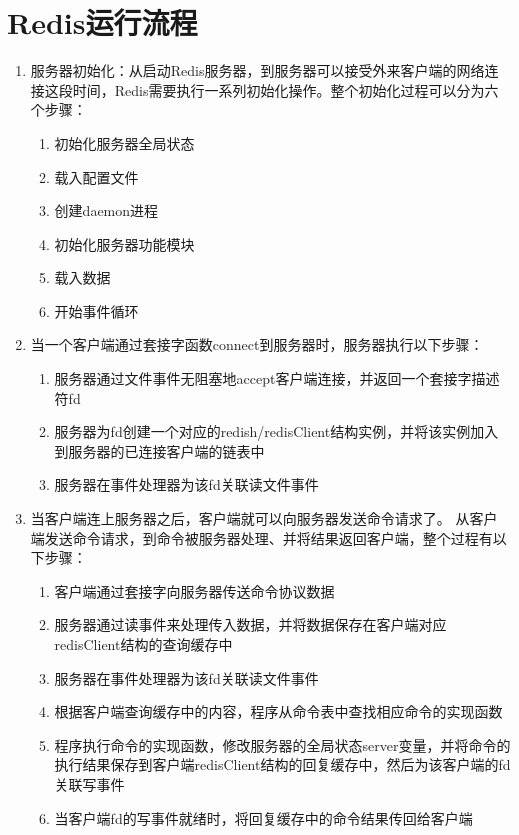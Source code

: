 \documentclass[proposal]{zjutreport}
\begin{document}
\section{Redis运行流程}
\begin{enumerate}[label=\arabic*.]
\item{服务器初始化：从启动Redis服务器，到服务器可以接受外来客户端的网络连接这段时间，Redis需要执行一系列初始化操作。整个初始化过程可以分为六个步骤：
\begin{enumerate}[label=\Roman{*}.]
\item{初始化服务器全局状态}
\item{载入配置文件}
\item{创建daemon进程}
\item{初始化服务器功能模块}
\item{载入数据}
\item{开始事件循环}
\end{enumerate}
}

\item{当一个客户端通过套接字函数connect到服务器时，服务器执行以下步骤：
\begin{enumerate}[label=\Roman{*}.]
\item{服务器通过文件事件无阻塞地accept客户端连接，并返回一个套接字描述符fd}
\item{服务器为fd创建一个对应的redish/redisClient结构实例，并将该实例加入到服务器的已连接客户端的链表中}
\item{服务器在事件处理器为该fd关联读文件事件}
\end{enumerate}
}

\item{
当客户端连上服务器之后，客户端就可以向服务器发送命令请求了。
从客户端发送命令请求，到命令被服务器处理、并将结果返回客户端，整个过程有以下步骤：
\begin{enumerate}[label=\Roman{*}.]
\item{客户端通过套接字向服务器传送命令协议数据}
\item{服务器通过读事件来处理传入数据，并将数据保存在客户端对应redisClient结构的查询缓存中}
\item{服务器在事件处理器为该fd关联读文件事件}
\item{根据客户端查询缓存中的内容，程序从命令表中查找相应命令的实现函数}
\item{程序执行命令的实现函数，修改服务器的全局状态server变量，并将命令的执行结果保存到客户端redisClient结构的回复缓存中，然后为该客户端的fd关联写事件}
\item{当客户端fd的写事件就绪时，将回复缓存中的命令结果传回给客户端}
\end{enumerate}
}
\end{enumerate}
\end{document}
